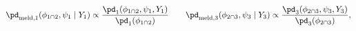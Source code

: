 \begin{equation}
  \pd_{\text{meld}, 1} (\phi_{1 \cap 2}, \psi_{1} \mid Y_{1}) \propto
  \frac {
    \pd_{1}(\phi_{1 \cap 2}, \psi_{1}, Y_{1})
  } {
    \pd_{1}(\phi_{1 \cap 2})
  }
  \qquad
  \pd_{\text{meld}, 3} (\phi_{2 \cap 3}, \psi_{3} \mid Y_{3}) \propto
  \frac {
    \pd_{3}(\phi_{2 \cap 3}, \psi_{3}, Y_{3})
  } {
    \pd_{3}(\phi_{2 \cap 3})
  },
  \label{eqn:stage-one-targets}
\end{equation}